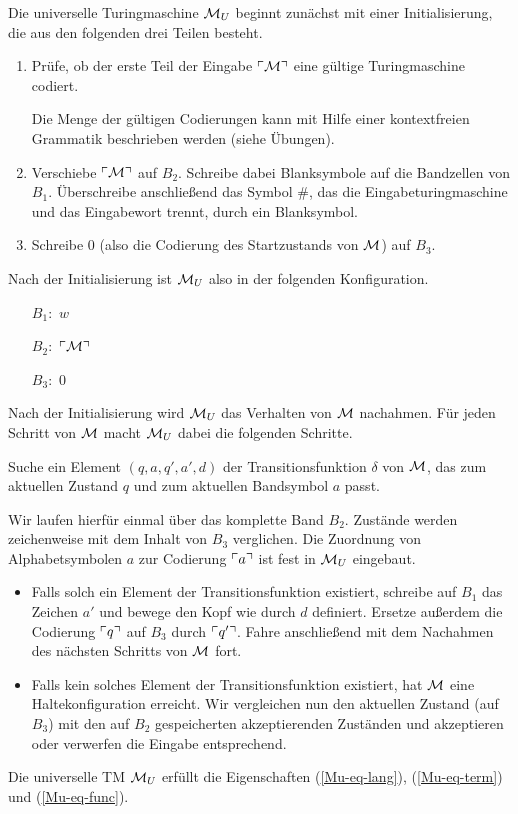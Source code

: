 Die universelle Turingmaschine $\mathcal{M}_U$ beginnt zunächst mit einer Initialisierung, die aus den folgenden drei Teilen besteht.

\begin{enumerate}
 \item Prüfe, ob der erste Teil der Eingabe $\ulcorner \mathcal{M} \urcorner$ eine gültige Turingmaschine codiert.
 
 Die Menge der gültigen Codierungen kann mit Hilfe einer kontextfreien Grammatik beschrieben werden (siehe Übungen).
 
 \item Verschiebe $\ulcorner \mathcal{M} \urcorner$ auf $B_2$. Schreibe dabei Blanksymbole auf die Bandzellen von $B_1$.
 Überschreibe anschließend das Symbol $\#$, das die Eingabeturingmaschine und das Eingabewort trennt, durch ein Blanksymbol.
 
 \item Schreibe $0$ (also die Codierung des Startzustands von $\mathcal{M}$) auf $B_3$.
\end{enumerate}

Nach der Initialisierung ist $\mathcal{M}_U$ also in der folgenden Konfiguration.
\begin{itemize}
\item[$B_1:$] $w$
\item[$B_2:$] $\ulcorner \mathcal{M} \urcorner$
\item[$B_3:$] $0$
\end{itemize}

Nach der Initialisierung wird $\mathcal{M}_U$ das Verhalten von $\mathcal{M}$ nachahmen.
Für jeden Schritt von $\mathcal{M}$ macht $\mathcal{M}_U$ dabei die folgenden Schritte.

 Suche ein Element $(q, a, q', a', d)$ der Transitionsfunktion $\delta$ von $\mathcal{M}$, das zum aktuellen Zustand $q$ und zum aktuellen Bandsymbol $a$ passt.
 
 Wir laufen hierfür einmal über das komplette Band $B_2$. 
 Zustände werden zeichenweise mit dem Inhalt von $B_3$ verglichen.
 Die Zuordnung von Alphabetsymbolen $a$ zur Codierung $\ulcorner a \urcorner$ ist fest in $\mathcal{M}_U$ eingebaut.
 
 \begin{itemize}
 
 \item Falls solch ein Element der Transitionsfunktion existiert,
    schreibe auf $B_1$ das Zeichen $a'$ und bewege den Kopf wie durch $d$ definiert.
    Ersetze außerdem die Codierung $\ulcorner q \urcorner$ auf $B_3$ durch $\ulcorner q' \urcorner$.
    Fahre anschließend mit dem Nachahmen des nächsten Schritts von $\mathcal{M}$ fort.
    
 \item Falls kein solches Element der Transitionsfunktion existiert, hat $\mathcal{M}$ eine Haltekonfiguration erreicht.
 Wir vergleichen nun den aktuellen Zustand (auf $B_3$) mit den auf $B_2$ gespeicherten akzeptierenden Zuständen und akzeptieren oder verwerfen die Eingabe entsprechend.

\end{itemize}

\begin{Satz}
	Die universelle \ac{TM} $\mathcal{M}_U$ erfüllt die Eigenschaften (\ref{Mu-eq-lang}), (\ref{Mu-eq-term}) und (\ref{Mu-eq-func}).
\end{Satz}


